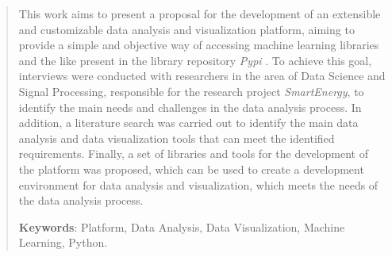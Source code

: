 \begin{abstract}
    \noindent
    \justifying

    This work aims to present a proposal for the development of an extensible and customizable data analysis and visualization platform, aiming to provide a simple and objective way of accessing machine learning libraries and the like present in the library repository \textit{Pypi }. To achieve this goal, interviews were conducted with researchers in the area of Data Science and Signal Processing, responsible for the research project \textit{SmartEnergy}, to identify the main needs and challenges in the data analysis process. In addition, a literature search was carried out to identify the main data analysis and data visualization tools that can meet the identified requirements. Finally, a set of libraries and tools for the development of the platform was proposed, which can be used to create a development environment for data analysis and visualization, which meets the needs of the data analysis process.


    \textbf{Keywords}: Platform, Data Analysis, Data Visualization, Machine Learning, Python.
\end{abstract}

\newpage
